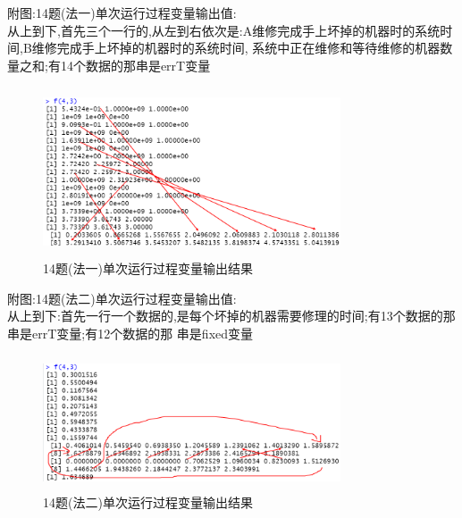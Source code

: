\documentclass{book}
\begin{document}
\noindent
附图:14题(法一)单次运行过程变量输出值: \\
从上到下,首先三个一行的,从左到右依次是:A维修完成手上坏掉的机器时的系统时间,B维修完成手上坏掉的机器时的系统时间,
系统中正在维修和等待维修的机器数量之和;有14个数据的那串是errT变量
\begin{figure}[H]
    \centering
    \includegraphics*[height = 5cm, width = 8.8cm]{gramFile/十四题/14题(法一)单次运行过程变量输出结果.PNG}
    \caption{14题(法一)单次运行过程变量输出结果}
\end{figure}
 
\noindent
附图:14题(法二)单次运行过程变量输出值: \\
从上到下:首先一行一个数据的,是每个坏掉的机器需要修理的时间;有13个数据的那串是errT变量;有12个数据的那
串是fixed变量  \\
\begin{figure}[H]
    \centering
    \includegraphics*[height = 4cm, width = 8.8cm]{gramFile/十四题/14题(法二)单次运行过程变量输出结果.PNG}
    \caption{14题(法二)单次运行过程变量输出结果}
\end{figure}
\end{document}

